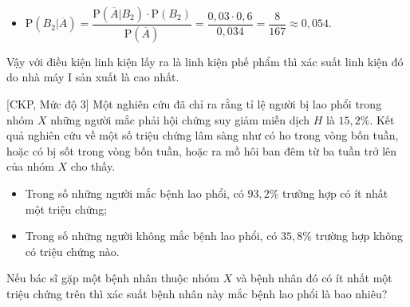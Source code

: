 \begin{bt}
{\begin{enumerate}
\begin{itemize}
				\item $\mathrm{P}\left(B_2|\overline{A}\right)=\dfrac{\mathrm{P}\left(\overline{A}|B_2\right)\cdot \mathrm{P}(B_2)}{\mathrm{P}\left(\overline{A}\right)} = \dfrac{0{,}03\cdot 0{,}6}{0{,}034} = \dfrac{8}{167}\approx 0{,}054$.
			\end{itemize}
			Vậy với điều kiện linh kiện lấy ra là linh kiện phế phẩm thì xác suất linh kiện đó do nhà máy I sản xuất là cao nhất.
		\end{enumerate}
	}
\end{bt}

\begin{bt}%
[CKP, Mức độ 3]%
	Một nghiên cứu đã chỉ ra rằng tỉ lệ người bị lao phổi trong nhóm $X$ những người mắc phải hội chứng suy giảm miễn dịch $ {H}$ là $15{,}2 \%$. Kết quả nghiên cứu về một số triệu chứng lâm sàng như có ho trong vòng bốn tuần, hoặc có bị sốt trong vòng bốn tuần, hoặc ra mồ hôi ban đêm từ ba tuần trở lên của nhóm $X$ cho thấy.
	\begin{itemize}
		\item Trong số những người mắc bệnh lao phổi, có $93{,}2 \%$ trường hợp có ít nhất một triệu chứng;
		\item Trong số những người không mắc bệnh lao phổi, có $35{,}8 \%$ trường hợp không có triệu chứng nào.
	\end{itemize}
	Nếu bác sĩ gặp một bệnh nhân thuộc nhóm $X$ và bệnh nhân đó có ít nhất một triệu chứng trên thì xác suất bệnh nhân này mắc bệnh lao phổi là bao nhiêu?
\end{bt}
